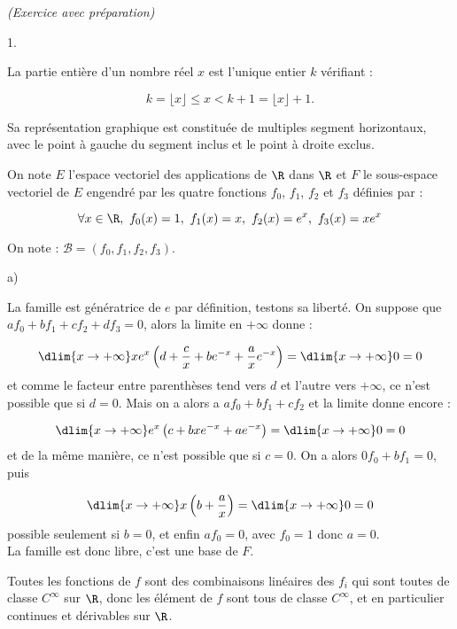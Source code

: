 \documentclass[11pt]{article}%
\begin{document}
\newpage

\begin{exercice}{\it (Exercice avec préparation)}~
 \begin{noliste}{1.}
 \setlength{\itemsep}{4mm}
 \item La partie entière d'un nombre réel $x$ est l'unique entier $k$
 vérifiant :
 
\[
 k = \lfloor x \rfloor \leq x < k + 1 = \lfloor x \rfloor + 1. 
\]
 
 Sa représentation graphique est constituée de multiples segment
 horizontaux, avec le point à gauche du segment inclus et le point
 à droite exclus.
 
 On note $E$ l'espace vectoriel des applications de $\R$ dans $\R$
 et $F$ le sous-espace vectoriel de $E$ engendré par les quatre
 fonctions $f_{0}$, $f_{1}$, $f_{2}$ et $f_{3}$ définies par :
 
\[
 \forall x \in \R, \ f_{0} (x) = 1, \ f_{1} (x) = x, \ f_{2} (x) =
e^{x}, \ f_{3} (x) = x e^{x} 
\]

 \item On note : $\mathcal{B} = (f_{0}, f_{1}, f_{2}, f_{3})$.
 \begin{noliste}{a)}
 \setlength{\itemsep}{2mm}
 \item La famille est génératrice de $e$ par définition, testons sa
 liberté. On suppose que $a f_{0} + b f_{1} + c f_{2} + d f_{3} = 0$,
 alors la limite en $ + \infty$ donne :
 
\[
 \dlim{ x \rightarrow + \infty } x e^{x} \left( d + \frac{ c }{ x }
 + b e^{-x} + \frac{ a }{ x } e^{ - x } \right) = \dlim{ x
 \rightarrow + \infty } 0 = 0
\]
 et comme le facteur entre parenthèses tend vers $d$ et l'autre
 vers $ + \infty$, ce n'est possible que si $d = 0$. Mais on a alors
 a $ a f_{0} + b f_{1} + c f_{2}$ et la limite donne encore :
 
\[
 \dlim{ x \rightarrow + \infty } e^{x} \left( c + b x e^{-x} + a e^{
 - x } \right) = \dlim{ x \rightarrow + \infty } 0 = 0
\]
 et de la même manière, ce n'est possible que si $c = 0$. On a
 alors $0 f_{0} + b f_{1} = 0$, puis
 
\[
 \dlim{ x \rightarrow + \infty } x \left( b + \frac{a}{x} \right)
 = \dlim{ x \rightarrow + \infty } 0 = 0
\]
 possible seulement si $b = 0$, et enfin $a f_{0} = 0$, avec $f_{0} = 
 1$ donc $a = 0$.\\
 La famille est donc libre, c'est une base de $F$. 

 \item Toutes les fonctions de $f$ sont des combinaisons linéaires
 des $f_{i}$ qui sont toutes de classe $C^{ \infty }$ sur $\R$,
 donc les élément de $f$ sont tous de classe $C^{ \infty }$, et
 en particulier continues et dérivables sur $\R$.


\end{noliste}
\end{noliste}
\end{exercice}
\end{document}
